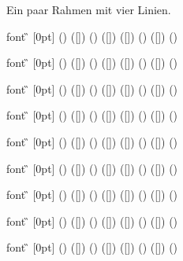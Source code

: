 \newpage
Ein paar Rahmen mit vier Linien.
\begin{bsp}
         font {\G} [0pt]
         () ([]) ()
         ([])        ([])
         () ([]) ()
\end{bsp}
\make

\begin{bsp}
         font {\G} [0pt]
         () ([]) ()
         ([])        ([])
         () ([]) ()
\end{bsp}
\make

\begin{bsp}
         font {\G} [0pt]
         () ([]) ()
         ([])        ([])
         () ([]) ()
\end{bsp}
\make

\begin{bsp}
         font {\G} [0pt]
         () ([]) ()
         ([])        ([])
         () ([]) ()
\end{bsp}
\make

\begin{bsp}
         font {\G} [0pt]
         () ([]) ()
         ([])        ([])
         () ([]) ()
\end{bsp}
\make

\begin{bsp}
         font {\G} [0pt]
         () ([]) ()
         ([])        ([])
         () ([]) ()
\end{bsp}
\make

\begin{bsp}
         font {\G} [0pt]
         () ([]) ()
         ([])        ([])
         () ([]) ()
\end{bsp}
\make

\begin{bsp}
         font {\G} [0pt]
         () ([]) ()
         ([])        ([])
         () ([]) ()
\end{bsp}
\make

\begin{bsp}
         font {\G} [0pt]
         () ([]) ()
         ([])        ([])
         () ([]) ()
\end{bsp}
\make

